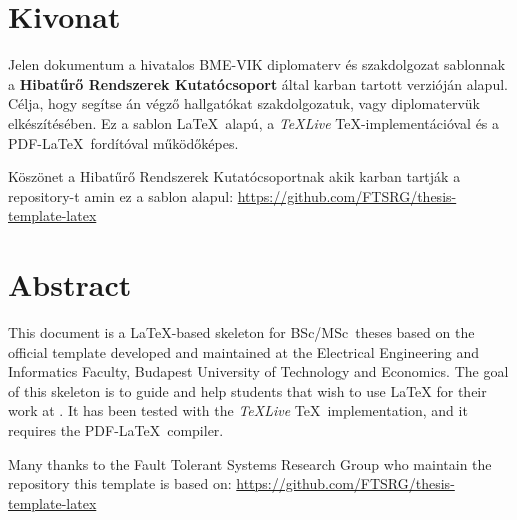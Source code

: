 \setcounter{page}{1}

\selecthungarian

\chapter*{Kivonat}

Jelen dokumentum a hivatalos BME-VIK diplomaterv és szakdolgozat sablonnak a \textbf{Hibatűrő Rendszerek Kutatócsoport} által karban tartott verzióján alapul. Célja, hogy segítse \sze{} \kvik án végző hallgatókat szakdolgozatuk, vagy diplomatervük elkészítésében. Ez a sablon \LaTeX~alapú, a \emph{TeXLive} \TeX-implementációval és a PDF-\LaTeX~fordítóval működőképes. 

Köszönet a Hibatűrő Rendszerek Kutatócsoportnak akik karban tartják a repository-t amin ez a sablon alapul:
\url{https://github.com/FTSRG/thesis-template-latex}


\vfill
\selectenglish


\chapter*{Abstract}

This document is a \LaTeX-based skeleton for BSc/MSc~theses based on the official template developed and maintained at the Electrical Engineering and Informatics Faculty, Budapest University of Technology and Economics. The goal of this skeleton is to guide and help students that wish to use \LaTeX{} for their work at \sze{} \kvik. It has been tested with the \emph{TeXLive} \TeX~implementation, and it requires the PDF-\LaTeX~compiler.

Many thanks to the Fault Tolerant Systems Research Group who maintain the repository this template is based on: \url{https://github.com/FTSRG/thesis-template-latex}


\vfill
\selectthesislanguage

\setcounter{romanPage}{\value{page}}
